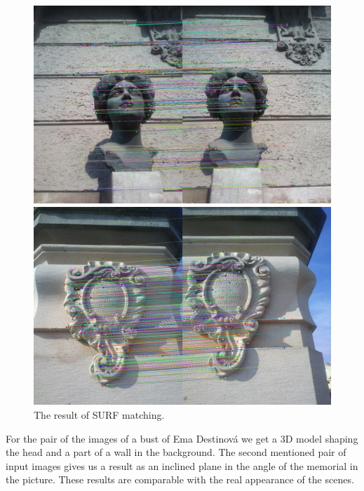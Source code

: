 \begin{figure}[h]
\centerline{
\includegraphics[width=12.0cm]{img/ema_matching.png}}
\centerline{
\includegraphics[width=12.0cm]{img/memorial_matching.png}}
\caption{The result of SURF matching.}
\label{fig:matching}
\end{figure}

For the pair of the images of a bust of Ema Destinová we get a 3D model shaping the head and a part of a wall in the background.
The second mentioned pair of input images gives us a result as an inclined plane in the angle of the memorial in the picture.
These results are comparable with the real appearance of the scenes.

